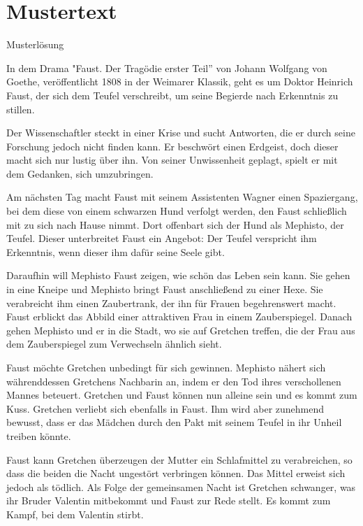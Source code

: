   

\section{Mustertext}

Musterlösung 

In dem Drama "Faust. Der Tragödie erster Teil” von Johann Wolfgang von Goethe, veröffentlicht 1808 in der Weimarer Klassik, geht es um Doktor Heinrich Faust, der sich dem Teufel verschreibt, um seine Begierde nach Erkenntnis zu stillen. 

Der Wissenschaftler steckt in einer Krise und sucht Antworten, die er durch seine Forschung jedoch nicht finden kann. Er beschwört einen Erdgeist, doch dieser macht sich nur lustig über ihn. Von seiner Unwissenheit geplagt, spielt er mit dem Gedanken, sich umzubringen. 

 

Am nächsten Tag macht Faust mit seinem Assistenten Wagner einen Spaziergang, bei dem diese von einem schwarzen Hund verfolgt werden, den Faust schließlich mit zu sich nach Hause nimmt. Dort offenbart sich der Hund als Mephisto, der Teufel. Dieser unterbreitet Faust ein Angebot: Der Teufel verspricht ihm Erkenntnis, wenn dieser ihm dafür seine Seele gibt. 

 

Daraufhin will Mephisto Faust zeigen, wie schön das Leben sein kann. Sie gehen in eine Kneipe und Mephisto bringt Faust anschließend zu einer Hexe. Sie verabreicht ihm einen Zaubertrank, der ihn für Frauen begehrenswert macht. Faust erblickt das Abbild einer attraktiven Frau in einem Zauberspiegel. Danach gehen Mephisto und er in die Stadt, wo sie auf Gretchen treffen, die der Frau aus dem Zauberspiegel zum Verwechseln ähnlich sieht. 

 

Faust möchte Gretchen unbedingt für sich gewinnen. Mephisto nähert sich währenddessen Gretchens Nachbarin an, indem er den Tod ihres verschollenen Mannes beteuert. Gretchen und Faust können nun alleine sein und es kommt zum Kuss. Gretchen verliebt sich ebenfalls in Faust. Ihm wird aber zunehmend bewusst, dass er das Mädchen durch den Pakt mit seinem Teufel in ihr Unheil treiben könnte. 

 

Faust kann Gretchen überzeugen der Mutter ein Schlafmittel zu verabreichen, so dass die beiden die Nacht ungestört verbringen können. Das Mittel erweist sich jedoch als tödlich. Als Folge der gemeinsamen Nacht ist Gretchen schwanger, was ihr Bruder Valentin mitbekommt und Faust zur Rede stellt. Es kommt zum Kampf, bei dem Valentin stirbt. 

